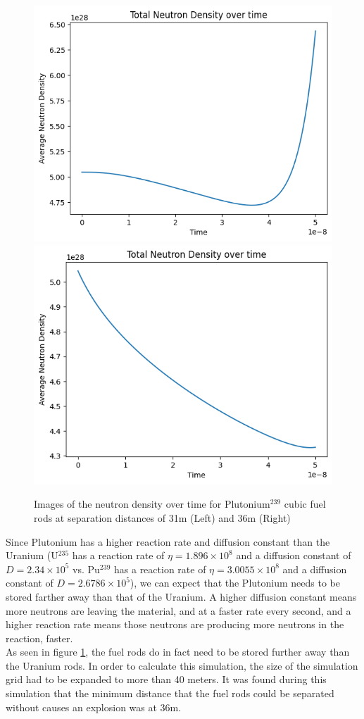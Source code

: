 \documentclass[letterpaper, 12pt]{article}
\begin{document}
         \begin{figure}[h!]
            \centering
            \includegraphics[width=0.45\linewidth]{Graphs/Criticality-Test-Pu-239-31m.png}
            \includegraphics[width=0.45\linewidth]{Graphs/Criticality-Test-Pu-239-36m.png}
            \caption{Images of the neutron density over time for Plutonium$^{239}$ cubic fuel rods at separation distances of 31m (Left) and 36m (Right)}
            \label{img:Plutonium-Criticality-Test}
         \end{figure}

         Since Plutonium has a higher reaction rate and diffusion constant than the Uranium (U$^{235}$ has a reaction rate of $\eta = 1.896 \times 10^8$ and a diffusion constant of $D = 2.34 \times 10^5$  vs. Pu$^{239}$ has a reaction rate of $\eta = 3.0055 \times 10^{8}$ and a diffusion constant of $D = 2.6786 \times 10^5$), we can expect that the Plutonium needs to be stored farther away than that of the Uranium. A higher diffusion constant means more neutrons are leaving the material, and at a faster rate every second, and a higher reaction rate means those neutrons are producing more neutrons in the reaction, faster.\\

         As seen in figure \ref{img:Plutonium-Criticality-Test}, the fuel rods do in fact need to be stored further away than the Uranium rods. In order to calculate this simulation, the size of the simulation grid had to be expanded to more than 40 meters. It was found during this simulation that the minimum distance that the fuel rods could be separated without causes an explosion was at 36m.
\end{document}
